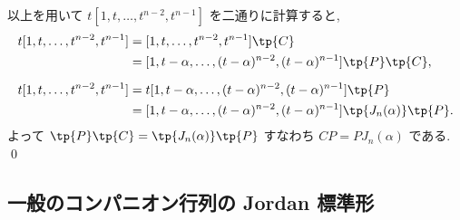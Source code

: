 \documentclass[12pt,twoside]{jarticle}
\begin{document}
以上を用いて $t [1,t,\dots,t^{n-2},t^{n-1}]$ を二通りに計算すると,
\begin{align*}
  t [1,t,\dots,t^{n-2},t^{n-1}] 
  &
  = [1,t,\dots,t^{n-2},t^{n-1}]\tp{C}
  \\ &
  = [1,t-\alpha,\dots,(t-\alpha)^{n-2},(t-\alpha)^{n-1}] 
    \tp{P}\tp{C},
  \\[\medskipamount]
  t [1,t,\dots,t^{n-2},t^{n-1}]
  &
  = t[1,t-\alpha,\dots,(t-\alpha)^{n-2},(t-\alpha)^{n-1}]\tp{P}
  \\ &
  = [1,t-\alpha,\dots,(t-\alpha)^{n-2},(t-\alpha)^{n-1}] 
    \tp{J_n(\alpha)}\tp{P}.
\end{align*}
よって $\tp{P}\tp{C}=\tp{J_n(\alpha)} \tp{P}$ 
すなわち $CP=PJ_n(\alpha)$ である.
\qed


\subsection{一般のコンパニオン行列の Jordan 標準形}
\label{sec:companion-jordan}

\end{document}
